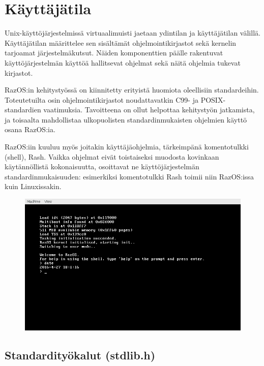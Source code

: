\chapter{Käyttäjätila}
\label{Käyttäjätila}

Unix-käyttöjärjestelmissä virtuaalimuisti jaetaan ydintilan ja käyttäjätilan välillä. Käyttäjätilan määrittelee sen sisältämät ohjelmointikirjastot sekä kernelin tarjoamat järjestelmäkutsut. Näiden komponenttien päälle rakentuvat käyttöjärjestelmän käyttöä hallitsevat ohjelmat sekä näitä ohjelmia tukevat kirjastot.

\par

RazOS:in kehitystyössä on kiinnitetty erityistä huomiota oleellisiin standardeihin. Toteutetuilta osin ohjelmointikirjastot noudattavatkin C99- ja POSIX- standardien vaatimuksia. Tavoitteena on ollut helpottaa kehitystyön jatkamista, ja toisaalta mahdollistaa ulkopuolisten standardinmukaisten ohjelmien käyttö osana RazOS:ia.

\par

RazOS:iin kuuluu myös joitakin käyttäjäohjelmia, tärkeimpänä komentotulkki (shell), Rash. Vaikka ohjelmat eivät toistaiseksi muodosta kovinkaan käytännöllistä kokonaisuutta, osoittavat ne käyttöjärjestelmän standardinmukaisuuden: esimerkiksi komentotulkki Rash toimii niin RazOS:issa kuin Linuxissakin.

\begin{figure}[H]
\centering
\includegraphics[width=\textwidth]{../figures/rash.png}
\label{fig:rash.png}
\end{figure}

\section{Standardityökalut (stdlib.h)}


